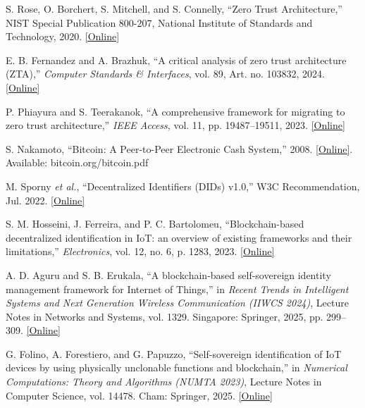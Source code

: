 \fontsize{7.5}{8.8}\selectfont
\setlength{\itemsep}{0pt}
\setlength{\parskip}{0pt}
S. Rose, O. Borchert, S. Mitchell, and S. Connelly, ``Zero Trust Architecture,'' NIST Special Publication 800-207, National Institute of Standards and Technology, 2020. \href{https://doi.org/10.6028/NIST.SP.800-207}{[Online]}

E. B. Fernandez and A. Brazhuk, ``A critical analysis of zero trust architecture (ZTA),'' \emph{Computer Standards \& Interfaces}, vol. 89, Art. no. 103832, 2024. \href{https://doi.org/10.1016/j.csi.2024.103832}{[Online]}

P. Phiayura and S. Teerakanok, ``A comprehensive framework for migrating to zero trust architecture,'' \emph{IEEE Access}, vol. 11, pp. 19487--19511, 2023. \href{https://doi.org/10.1109/ACCESS.2023.3248622}{[Online]}

S. Nakamoto, ``Bitcoin: A Peer-to-Peer Electronic Cash System,'' 2008. \href{https://bitcoin.org/bitcoin.pdf}{[Online]}. Available: bitcoin.org/bitcoin.pdf

M. Sporny \emph{et al.}, ``Decentralized Identifiers (DIDs) v1.0,'' W3C Recommendation, Jul. 2022. \href{https://www.w3.org/TR/did-core/}{[Online]}

S. M. Hosseini, J. Ferreira, and P. C. Bartolomeu, ``Blockchain-based decentralized identification in IoT: an overview of existing frameworks and their limitations,'' \emph{Electronics}, vol. 12, no. 6, p. 1283, 2023. \href{https://doi.org/10.3390/electronics12061283}{[Online]}

A. D. Aguru and S. B. Erukala, ``A blockchain-based self-sovereign identity management framework for Internet of Things,'' in \emph{Recent Trends in Intelligent Systems and Next Generation Wireless Communication (IIWCS 2024)}, Lecture Notes in Networks and Systems, vol. 1329. Singapore: Springer, 2025, pp. 299--309. \href{https://doi.org/10.1007/978-981-96-4741-5_26}{[Online]}

G. Folino, A. Forestiero, and G. Papuzzo, ``Self-sovereign identification of IoT devices by using physically unclonable functions and blockchain,'' in \emph{Numerical Computations: Theory and Algorithms (NUMTA 2023)}, Lecture Notes in Computer Science, vol. 14478. Cham: Springer, 2025. \href{https://doi.org/10.1007/978-3-031-81247-7_26}{[Online]}

